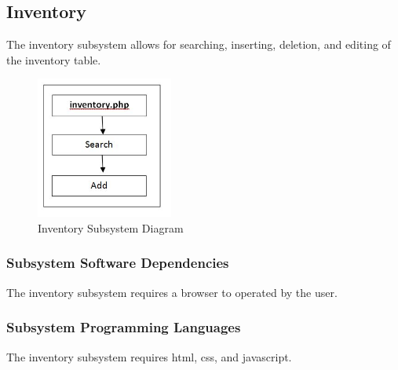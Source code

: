 \subsection{Inventory}
The inventory subsystem allows for searching, inserting, deletion, and editing of the inventory table.

\begin{figure}[h!]
	\centering
 	\includegraphics[width=0.40\textwidth]{images/inventory}
 \caption{Inventory Subsystem Diagram}
\end{figure}



\subsubsection{Subsystem Software Dependencies}
The inventory subsystem requires a browser to operated by the user.

\subsubsection{Subsystem Programming Languages}
The inventory subsystem requires html, css, and javascript.




